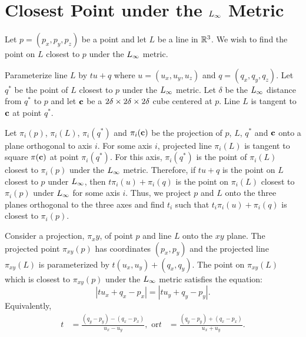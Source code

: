 
\appendix

\section{Closest Point under the $L_\infty$ Metric}
\label{appendix:Linf}

Let $p = (p_x, p_y, p_z)$ be a point and let $L$ be a line in $\mathbb{R}^{3}$.
We wish to find the point on $L$ closest to $p$ under the $L_\infty$ metric.

Parameterize line $L$ by $t u + q$
where $u = (u_x, u_y, u_z)$ and $q = (q_x, q_y, q_z)$.
Let $q^*$ be the point of $L$ closest to $p$ under the $L_\infty$ metric.
Let $\delta$ be the $L_\infty$ distance from $q^*$ to $p$
and let $\mathbf{c}$ be a $2\delta \times 2\delta \times 2\delta$ cube centered at $p$.
Line $L$ is tangent to $\mathbf{c}$ at point $q^*$.

Let $\pi_i(p)$, $\pi_i(L)$, $\pi_i(q^*)$ and $\pi_i(\mathbf{c})$
be the projection of $p$, $L$, $q^*$ and $\mathbf{c}$
onto a plane orthogonal to axis $i$.
For some axis $i$,
projected line $\pi_i(L)$ is tangent to square $\pi(\mathbf{c})$
at point $\pi_i(q^*)$.
For this axis, $\pi_i(q^*)$ is the point of $\pi_i(L)$
closest to $\pi_i(p)$ under the $L_\infty$ metric.
Therefore, if $tu+q$ is the point on $L$ closest to $p$ under $L_\infty$,
then $t \pi_i(u) + \pi_i(q)$ is the point 
on $\pi_i(L)$ closest to $\pi_i(p)$ under $L_\infty$ for some axis $i$.
Thus, we project $p$ and $L$ onto the three planes orthogonal 
to the three axes and find $t_i$ such that $t_i \pi_i(u) + \pi_i(q)$
is closest to $\pi_i(p)$.

Consider a projection, $\pi_xy$, 
of point $p$ and line $L$ onto the $xy$ plane.
The projected point $\pi_{xy}(p)$ has coordinates $(p_x,p_y)$
and the projected line $\pi_{xy}(L)$ is parameterized 
by $t(u_x,u_y) + (q_x,q_y)$.
The point on $\pi_{xy}(L)$ which is closest to $\pi_{xy}(p)$
under the $L_\infty$ metric satisfies the equation:
\begin{equation*}
|t u_x + q_x - p_x| = |t u_y + q_y - p_y|.
\end{equation*}
Equivalently,
\begin{align*}
t & = \frac{(q_y-p_y)-(q_x-p_x)}{u_x-u_y}, \mbox{ or}
t & = \frac{(q_y-p_y)+(q_x-p_x)}{u_x+u_y}.
\end{align*}

